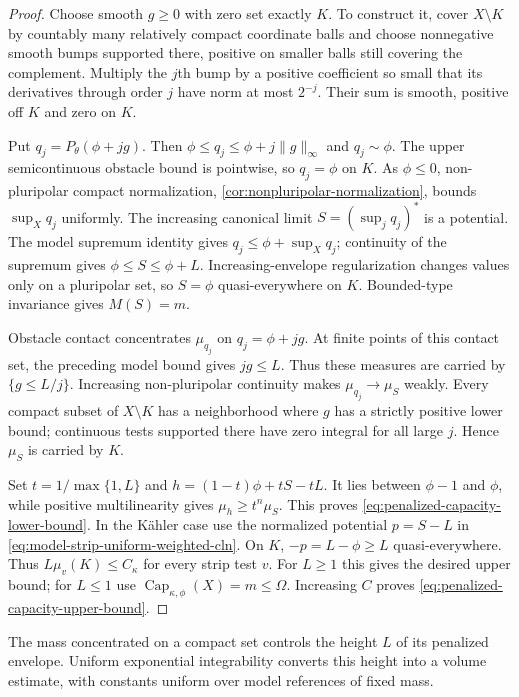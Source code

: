 \begin{proof}
Choose smooth $g\geq0$ with zero set exactly $K$. To construct it, cover $X\setminus K$ by countably many relatively compact coordinate balls and choose nonnegative smooth bumps supported there, positive on smaller balls still covering the complement. Multiply the $j$th bump by a positive coefficient so small that its derivatives through order $j$ have norm at most $2^{-j}$. Their sum is smooth, positive off $K$ and zero on $K$.

Put $q_j=P_\theta(\phi+jg)$. Then $\phi\leq q_j\leq\phi+j\|g\|_\infty$ and $q_j\sim\phi$. The upper semicontinuous obstacle bound is pointwise, so $q_j=\phi$ on $K$. As $\phi\leq0$, non-pluripolar compact normalization, \cref{cor:nonpluripolar-normalization}, bounds $\sup_Xq_j$ uniformly. The increasing canonical limit $S=(\sup_jq_j)^*$ is a potential. The model supremum identity gives $q_j\leq\phi+\sup_Xq_j$; continuity of the supremum gives $\phi\leq S\leq\phi+L$. Increasing-envelope regularization changes values only on a pluripolar set, so $S=\phi$ quasi-everywhere on $K$. Bounded-type invariance gives $M(S)=m$.

Obstacle contact concentrates $\mu_{q_j}$ on $q_j=\phi+jg$. At finite points of this contact set, the preceding model bound gives $jg\leq L$. Thus these measures are carried by $\{g\leq L/j\}$. Increasing non-pluripolar continuity makes $\mu_{q_j}\to\mu_S$ weakly. Every compact subset of $X\setminus K$ has a neighborhood where $g$ has a strictly positive lower bound; continuous tests supported there have zero integral for all large $j$. Hence $\mu_S$ is carried by $K$.

Set $t=1/\max\{1,L\}$ and $h=(1-t)\phi+tS-tL$. It lies between $\phi-1$ and $\phi$, while positive multilinearity gives $\mu_h\geq t^n\mu_S$. This proves \eqref{eq:penalized-capacity-lower-bound}. In the K\"ahler case use the normalized potential $p=S-L$ in \eqref{eq:model-strip-uniform-weighted-cln}. On $K$, $-p=L-\phi\geq L$ quasi-everywhere. Thus $L\mu_v(K)\leq C_\kappa$ for every strip test $v$. For $L\geq1$ this gives the desired upper bound; for $L\leq1$ use $\operatorname{Cap}_{\kappa,\phi}(X)=m\leq\Omega$. Increasing $C$ proves \eqref{eq:penalized-capacity-upper-bound}.
\end{proof}

The mass concentrated on a compact set controls the height $L$ of its penalized envelope. Uniform exponential integrability converts this height into a volume estimate, with constants uniform over model references of fixed mass.

